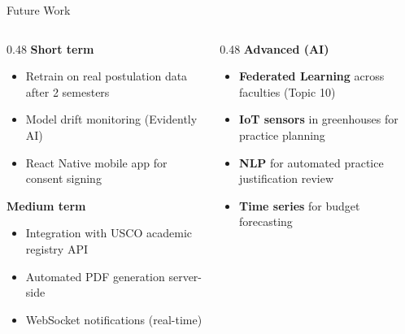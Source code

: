 \documentclass[aspectratio=169,12pt]{beamer}
\begin{document}
\begin{frame}{Future Work}
  \begin{columns}[T]
    \begin{column}{0.48\textwidth}
      \textbf{Short term}
      \begin{itemize}
        \item Retrain on real postulation data after 2 semesters
        \item Model drift monitoring (Evidently AI)
        \item React Native mobile app for consent signing
      \end{itemize}
      \vspace{0.3cm}
      \textbf{Medium term}
      \begin{itemize}
        \item Integration with USCO academic registry API
        \item Automated PDF generation server-side
        \item WebSocket notifications (real-time)
      \end{itemize}
    \end{column}
    \begin{column}{0.48\textwidth}
      \textbf{Advanced (AI)}
      \begin{itemize}
        \item \textbf{Federated Learning} across faculties (Topic 10)
        \item \textbf{IoT sensors} in greenhouses for practice planning
        \item \textbf{NLP} for automated practice justification review
        \item \textbf{Time series} for budget forecasting
      \end{itemize}
    \end{column}
  \end{columns}
\end{frame}
\end{document}
